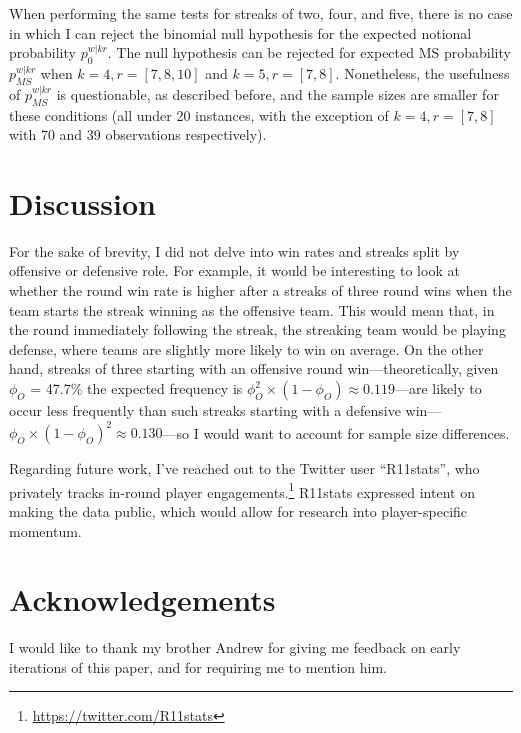 \documentclass{article}
\begin{document}
When performing the same tests for streaks of two, four, and five, there
is no case in which I can reject the binomial null hypothesis for the
expected notional probability \(p^{w|kr}_0\). The null hypothesis can be
rejected for expected MS probability \(p^{w|kr}_{MS}\) when
\(k = 4, r = [7, 8, 10]\) and \(k = 5, r = [7, 8]\). Nonetheless, the
usefulness of \(p^{w|kr}_{MS}\) is questionable, as described before,
and the sample sizes are smaller for these conditions (all under 20
instances, with the exception of \(k = 4, r = [7, 8]\) with 70 and 39
observations respectively).

\hypertarget{discussion}{%
\section{Discussion}\label{discussion}}

For the sake of brevity, I did not delve into win rates and streaks
split by offensive or defensive role. For example, it would be
interesting to look at whether the round win rate is higher after a
streaks of three round wins when the team starts the streak winning as
the offensive team. This would mean that, in the round immediately
following the streak, the streaking team would be playing defense, where
teams are slightly more likely to win on average. On the other hand,
streaks of three starting with an offensive round win---theoretically,
given \(\phi_O\) = 47.7\% the expected frequency is
\(\phi_O^2 \times (1 - \phi_O) \approx 0.119\)---are likely to occur
less frequently than such streaks starting with a defensive
win---\(\phi_O \times (1 - \phi_O)^2 \approx 0.130\)---so I would want
to account for sample size differences.

Regarding future work, I've reached out to the Twitter user
``R11stats'', who privately tracks in-round player
engagements.\footnote{\url{https://twitter.com/R11stats}} R11stats
expressed intent on making the data public, which would allow for
research into player-specific momentum.

\hypertarget{acknowledgements}{%
\section*{Acknowledgements}\label{acknowledgements}}

I would like to thank my brother Andrew for giving me feedback on early
iterations of this paper, and for requiring me to mention him.
\end{document}
